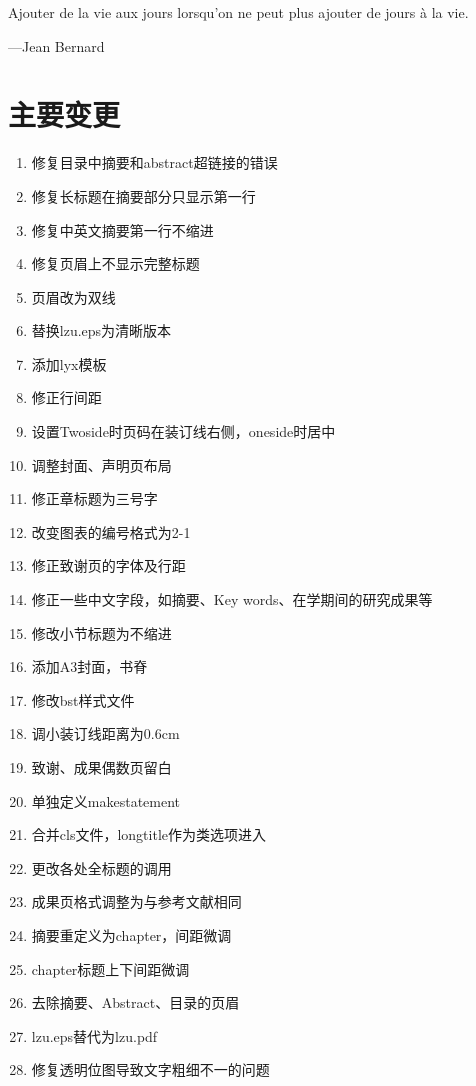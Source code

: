 \documentclass[twoside,longtitle]{LZUthesis}
\begin{document}
\begin{thanks}
Ajouter de la vie aux jours lorsqu'on ne peut plus ajouter de jours
à la vie.

\begin{flushright}
---Jean Bernard
\par\end{flushright}
\end{thanks}


\chapter{主要变更\label{chap:changelog}}
\begin{enumerate}
\item 修复目录中摘要和abstract超链接的错误
\item 修复长标题在摘要部分只显示第一行
\item 修复中英文摘要第一行不缩进
\item 修复页眉上不显示完整标题
\item 页眉改为双线
\item 替换lzu.eps为清晰版本
\item 添加lyx模板
\item 修正行间距
\item 设置Twoside时页码在装订线右侧，oneside时居中
\item 调整封面、声明页布局
\item 修正章标题为三号字
\item 改变图表的编号格式为2-1
\item 修正致谢页的字体及行距
\item 修正一些中文字段，如摘要、Key words、在学期间的研究成果等
\item 修改小节标题为不缩进
\item 添加A3封面，书脊
\item 修改bst样式文件
\item 调小装订线距离为0.6cm
\item 致谢、成果偶数页留白
\item 单独定义makestatement
\item 合并cls文件，longtitle作为类选项进入
\item 更改各处全标题的调用
\item 成果页格式调整为与参考文献相同
\item 摘要重定义为chapter，间距微调
\item chapter标题上下间距微调
\item 去除摘要、Abstract、目录的页眉
\item lzu.eps替代为lzu.pdf
\item 修复透明位图导致文字粗细不一的问题
\end{enumerate}
\end{document}
